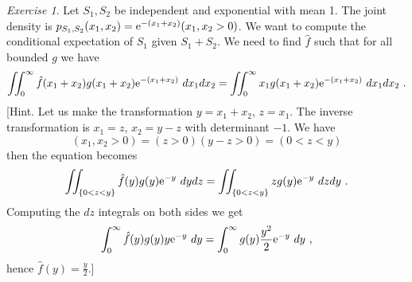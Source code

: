 \documentclass[12pt,a4paper]{amsart}
\theoremstyle{plain}%
\theoremstyle{definition}
\theoremstyle{remark}
\newtheorem{exercise}{Exercise}
\begin{document}
\begin{exercise}
Let $S_1,S_2$ be independent and exponential with mean 1. The joint density is $p_{S_1,S_2}(x_1,x_2) = \mathrm{e}^{-(x_1+x_2)}(x_1,x_2 > 0)$. We want to compute the conditional expectation of $S_1$ given $S_1+S_2$. We need to find $\hat f$ such that for all bounded $g$ we have
\begin{equation*}
  \iint_0^\infty \hat f(x_1+x_2)g(x_1+x_2)\mathrm{e}^{-(x_1+x_2)} \ dx_1dx_2 = \iint_0^\infty x_1g(x_1+x_2)\mathrm{e}^{-(x_1+x_2)} \ dx_1dx_2 \ .
\end{equation*}
[Hint. Let us make the transformation $y = x_1 + x_2$, $z = x_1$. The inverse transformation is $x_1 = z$, $x_2 = y - z$ with determinant $-1$. We have
\begin{equation*}
  (x_1,x_2>0) = (z > 0)(y - z > 0) = (0 < z < y)
\end{equation*}
then the equation becomes
\begin{equation*}
  \iint_{\left\{0 < z < y\right\}} \hat f(y)g(y)\mathrm{e}^{-y} \ dydz = \iint_{\left\{0<z<y\right\}} zg(y)\mathrm{e}^{-y} \ dzdy \ .
\end{equation*}
Computing the $dz$ integrals on both sides we get
\begin{equation*}
  \int_0^\infty \hat f(y)g(y)y\mathrm{e}^{-y} \ dy = \int_0^\infty g(y) \frac{y^2}2 \mathrm{e}^{-y} \ dy \ ,
\end{equation*}
hence $\hat f(y) = \frac y  2$.]
\end{exercise}
\end{document}
